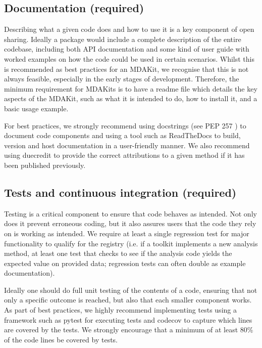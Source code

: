 \documentclass[9pt,whitepaper]{livecoms}
\begin{document}
\subsection{Documentation (required)}
\label{sec:documentation}

Describing what a given code does and how to use it is a key component of open sharing. Ideally a package would include a complete description of the entire codebase, including both API documentation and some kind of user guide with worked examples on how the code could be used in certain scenarios. Whilst this is recommended as best practices for an MDAKit, we recognise that this is not  always feasible, especially in the early stages of development. Therefore, the minimum requirement for MDAKits is to have a readme file which details the key aspects of the MDAKit, such as what it is intended to do, how to install it, and a basic usage example.

For best practices, we strongly recommend using docstrings (see PEP 257 \cite{noauthor_pep_nodate}) to document code components and using a tool such as ReadTheDocs \cite{read_the_docs_inc_read_2022} to build, version and host documentation in a user-friendly manner. We also recommend using duecredit \cite{halchenko_duecreditduecredit_2021} to provide the correct attributions to a given method if it has been published previously.

\subsection{Tests and continuous integration (required)}
\label{sec:tests}

Testing is a critical component to ensure that code behaves as intended. Not only does it prevent erroneous coding, but it also assures users that the code they rely on is working as intended. We require at least a single regression test for major functionality to qualify for the registry (i.e. if a toolkit implements a new analysis method, at least one test that checks to see if the analysis code yields the expected value on provided data;  regression tests can often double as example documentation).

Ideally one should do full unit testing of the contents of a code, ensuring that not only a specific outcome is reached, but also that each smaller component works. As part of best practices, we highly recommend implementing tests using a framework such as pytest \cite{krekel_pytest-devpytest_2004} for executing tests and codecov \cite{codecov_llc_codecov_2022} to capture which lines are covered by the tests. We strongly encourage that a minimum of at least 80\% of the code lines be covered by tests. 
\end{document}
